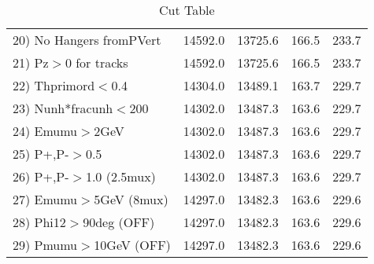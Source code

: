 \begin{table}[h!]
\begin{tabular}{||l||r|r|r|r||}
 20) No Hangers fromPVert &     14592.0 &     13725.6 &       166.5 &       233.7 \\
 21) Pz$>$0 for tracks    &     14592.0 &     13725.6 &       166.5 &       233.7 \\
 22) Thprimord$<$0.4      &     14304.0 &     13489.1 &       163.7 &       229.7 \\
 23) Nunh*fracunh$<$200   &     14302.0 &     13487.3 &       163.6 &       229.7 \\
 24) Emumu$>$2GeV         &     14302.0 &     13487.3 &       163.6 &       229.7 \\
 25) P+,P-$>$0.5          &     14302.0 &     13487.3 &       163.6 &       229.7 \\
 26) P+,P-$>$1.0 (2.5mux) &     14302.0 &     13487.3 &       163.6 &       229.7 \\
 27) Emumu$>$5GeV  (8mux) &     14297.0 &     13482.3 &       163.6 &       229.6 \\
 28) Phi12$>$90deg  (OFF) &     14297.0 &     13482.3 &       163.6 &       229.6 \\
 29) Pmumu$>$10GeV  (OFF) &     14297.0 &     13482.3 &       163.6 &       229.6 \\
 \hline
 \hline
 \end{tabular}
 \caption{Cut Table \cohpip }
 \label{tab-cut_copip}
 \end{table}

